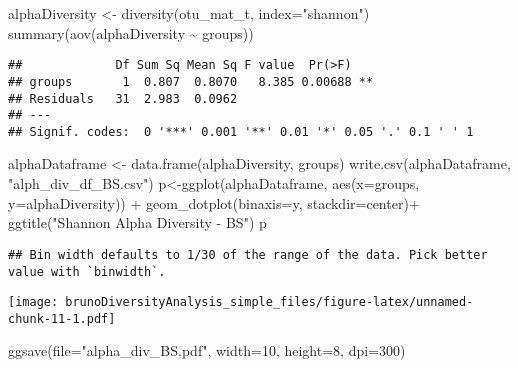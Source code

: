 \documentclass[
]{article}
\newenvironment{Shaded}{\begin{snugshade}}{\end{snugshade}}
\newcommand{\AttributeTok}[1]{\textcolor[rgb]{0.77,0.63,0.00}{#1}}
\newcommand{\DecValTok}[1]{\textcolor[rgb]{0.00,0.00,0.81}{#1}}
\newcommand{\FunctionTok}[1]{\textcolor[rgb]{0.00,0.00,0.00}{#1}}
\newcommand{\NormalTok}[1]{#1}
\newcommand{\OtherTok}[1]{\textcolor[rgb]{0.56,0.35,0.01}{#1}}
\newcommand{\SpecialCharTok}[1]{\textcolor[rgb]{0.00,0.00,0.00}{#1}}
\newcommand{\StringTok}[1]{\textcolor[rgb]{0.31,0.60,0.02}{#1}}
\begin{document}
\begin{Shaded}
\begin{Highlighting}[]
\NormalTok{alphaDiversity }\OtherTok{\textless{}{-}} \FunctionTok{diversity}\NormalTok{(otu\_mat\_t, }\AttributeTok{index=}\StringTok{"shannon"}\NormalTok{)}
\FunctionTok{summary}\NormalTok{(}\FunctionTok{aov}\NormalTok{(alphaDiversity }\SpecialCharTok{\textasciitilde{}}\NormalTok{ groups))}
\end{Highlighting}
\end{Shaded}

\begin{verbatim}
##             Df Sum Sq Mean Sq F value  Pr(>F)   
## groups       1  0.807  0.8070   8.385 0.00688 **
## Residuals   31  2.983  0.0962                   
## ---
## Signif. codes:  0 '***' 0.001 '**' 0.01 '*' 0.05 '.' 0.1 ' ' 1
\end{verbatim}

\begin{Shaded}
\begin{Highlighting}[]
\NormalTok{alphaDataframe }\OtherTok{\textless{}{-}} \FunctionTok{data.frame}\NormalTok{(alphaDiversity, groups)}
\FunctionTok{write.csv}\NormalTok{(alphaDataframe, }\StringTok{"alph\_div\_df\_BS.csv"}\NormalTok{)}
\NormalTok{p}\OtherTok{\textless{}{-}}\FunctionTok{ggplot}\NormalTok{(alphaDataframe, }\FunctionTok{aes}\NormalTok{(}\AttributeTok{x=}\NormalTok{groups, }\AttributeTok{y=}\NormalTok{alphaDiversity)) }\SpecialCharTok{+} 
  \FunctionTok{geom\_dotplot}\NormalTok{(}\AttributeTok{binaxis=}\StringTok{\textquotesingle{}y\textquotesingle{}}\NormalTok{, }\AttributeTok{stackdir=}\StringTok{\textquotesingle{}center\textquotesingle{}}\NormalTok{)}\SpecialCharTok{+}
  \FunctionTok{ggtitle}\NormalTok{(}\StringTok{"Shannon Alpha Diversity {-} BS"}\NormalTok{)}
\NormalTok{p}
\end{Highlighting}
\end{Shaded}

\begin{verbatim}
## Bin width defaults to 1/30 of the range of the data. Pick better value with `binwidth`.
\end{verbatim}

\texttt{[image: brunoDiversityAnalysis\_simple\_files/figure-latex/unnamed-chunk-11-1.pdf]}

\begin{Shaded}
\begin{Highlighting}[]
\FunctionTok{ggsave}\NormalTok{(}\AttributeTok{file=}\StringTok{"alpha\_div\_BS.pdf"}\NormalTok{, }\AttributeTok{width=}\DecValTok{10}\NormalTok{, }\AttributeTok{height=}\DecValTok{8}\NormalTok{, }\AttributeTok{dpi=}\DecValTok{300}\NormalTok{)}
\end{Highlighting}
\end{Shaded}
\end{document}
